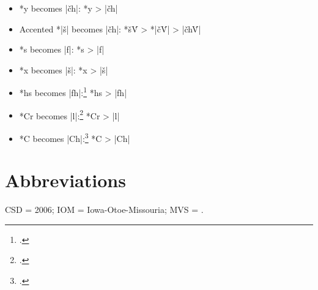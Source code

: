 \documentclass[output=paper]{LSP/langsci}
\begin{document}
\begin{itemize}
\item *y becomes |\v{c}h|: \hspace{5em} *y	>	|\v{c}h|
\item Accented *|š| becomes |\v{c}h|: \hspace{1em} *š\'V	>	*|\v{c}\'V|	>	|\v{c}h\'V|
\item *s becomes |f|: \hspace{6em} *s	>	|f|
\item *x becomes |š|: \hspace{6em} 	*x	>	|š|
\item *hs becomes |fh|:\footnote{\citealt[174, 299]{Rankinetal2006PDF}.}  \hspace{4.8em} 			*hs	>	|fh|
\item *Cr becomes |l|:\footnote{\citealt[90]{Rankinetal2006PDF}.}  \hspace{5em} 			*Cr	>	|l|
\item *C\textsuperscript{} becomes |Ch|:\footnote{\citealt[229, 232]{Rankinetal2006PDF}.}  \hspace{3.9em} *C\textsuperscript{}	>	|Ch|
\end{itemize}

\section*{Abbreviations}

CSD =  2006; IOM = Iowa-Otoe-Missouria; MVS = .

 
{\sloppy
\printbibliography[heading=subbibliography,notkeyword=this]
 }
\end{document}
